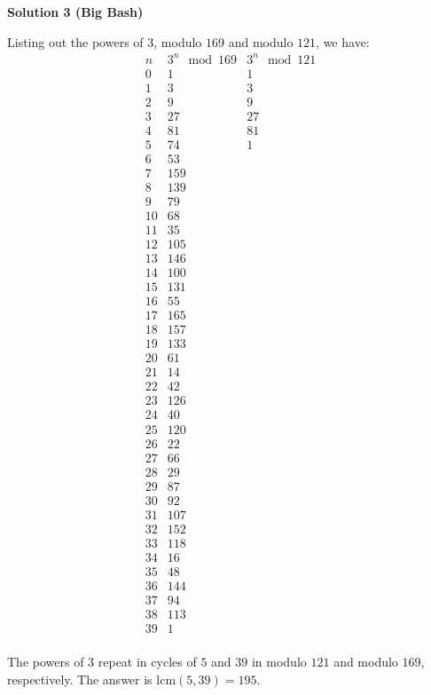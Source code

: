 \begin{enumerate}
 



\textbf{Solution 3 (Big Bash)}

Listing out the powers of $3$, modulo $169$ and modulo $121$, we have:
 \[\begin{array}{c|c|c} n & 3^n\mod{169} & 3^n\mod{121}\\ \hline 0 & 1 & 1\\ 1 & 3 & 3\\ 2 & 9 & 9\\ 3 & 27 & 27\\ 4 & 81 & 81\\ 5 & 74 & 1\\ 6 & 53\\ 7 & 159\\ 8 & 139\\ 9 & 79\\ 10 & 68\\ 11 & 35\\ 12 & 105\\ 13 & 146\\ 14 & 100\\ 15 & 131\\ 16 & 55\\ 17 & 165\\ 18 & 157\\ 19 & 133\\ 20 & 61\\ 21 & 14\\ 22 & 42\\ 23 & 126\\ 24 & 40\\ 25 & 120\\ 26 & 22\\ 27 & 66\\ 28 & 29\\ 29 & 87\\ 30 & 92\\ 31 & 107\\ 32 & 152\\ 33 & 118\\ 34 & 16\\ 35 & 48\\ 36 & 144\\ 37 & 94\\ 38 & 113\\ 39 & 1\\ \end{array}\]

 The powers of $3$ repeat in cycles of $5$ and $39$ in modulo $121$ and modulo $169$, respectively. The answer is $\text{lcm}(5, 39) = \boxed{195}$.


\end{enumerate}
